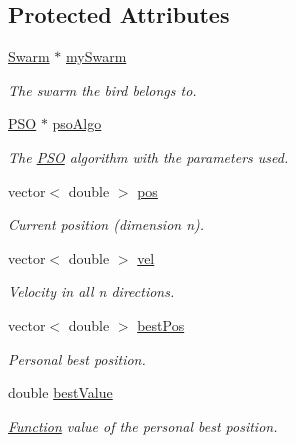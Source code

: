 \subsection*{Protected Attributes}
\begin{CompactItemize}
\item 
\hyperlink{classSwarm}{Swarm} $\ast$ \hyperlink{classBird_344bfd3227e0b7ef39eb339b9bc356ac}{mySwarm}
\begin{CompactList}\small\item\em The swarm the bird belongs to. \item\end{CompactList}\item 
\hyperlink{classPSO}{PSO} $\ast$ \hyperlink{classBird_fa9e55bba7454c55a49f30c6638ee758}{psoAlgo}
\begin{CompactList}\small\item\em The \hyperlink{classPSO}{PSO} algorithm with the parameters used. \item\end{CompactList}\item 
vector$<$ double $>$ \hyperlink{classBird_61cf7cbf8d338c6c1f6659935fb1c8e6}{pos}
\begin{CompactList}\small\item\em Current position (dimension n). \item\end{CompactList}\item 
vector$<$ double $>$ \hyperlink{classBird_51759f7c33635ab004999f3ed659166d}{vel}
\begin{CompactList}\small\item\em Velocity in all n directions. \item\end{CompactList}\item 
vector$<$ double $>$ \hyperlink{classBird_f3eff900924ce8434ca73e0e98b699a0}{bestPos}
\begin{CompactList}\small\item\em Personal best position. \item\end{CompactList}\item 
double \hyperlink{classBird_5a4c53e148fe7fd7c75d2ea0d9c4afaf}{bestValue}
\begin{CompactList}\small\item\em \hyperlink{classFunction}{Function} value of the personal best position. \item\end{CompactList}\item 

\end{CompactItemize}
